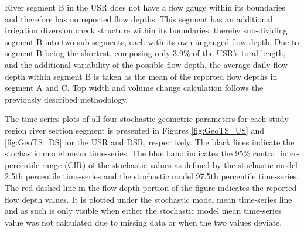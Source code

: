 \begin{linenumbers}
River segment B in the USR does not have a flow gauge within its boundaries and therefore has no reported flow depths. This segment has an additional irrigation diversion check structure within its boundaries, thereby sub-dividing segment B into two sub-segments, each with its own ungauged flow depth.  Due to segment B being the shortest, composing only 3.9\% of the USR's total length, and the additional variability of the possible flow depth, the average daily flow depth within segment B is taken as the mean of the reported flow depths in segment A and C.  Top width and volume change calculation follows the previously described methodology.

\clearpage
The time-series plots of all four stochastic geometric parameters for each study region river section segment is presented in Figures \ref{fig:GeoTS_US} and \ref{fig:GeoTS_DS} for the USR and DSR, respectively.  The black lines indicate the stochastic model mean time-series.  The blue band indicates the 95\% central inter-percentile range (CIR) of the stochastic values as defined by the stochastic model 2.5th percentile time-series and the stochastic model 97.5th percentile time-series.  The red dashed line in the flow depth portion of the figure indicates the reported flow depth values.  It is plotted under the stochastic model mean time-series line and as such is only visible when either the stochastic model mean time-series value was not calculated due to missing data or when the two values deviate.


\end{linenumbers}
